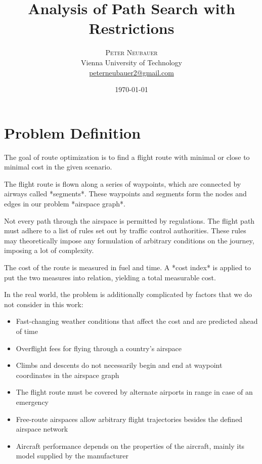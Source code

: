 \documentclass{article}
\title{Analysis of Path Search with Restrictions} %
\author{%
\textsc{Peter Neubauer} \\[1ex] %
\normalsize Vienna University of Technology \\ %
\normalsize \href{mailto:peterneubauer2@gmail.com}{peterneubauer2@gmail.com} %
}
\date{\today} %
\begin{document}
\maketitle


\section{Problem Definition}
The goal of route optimization is to find a flight route with minimal or close to minimal cost in the given scenario.

The flight route is flown along a series of waypoints, which are connected by airways called *segments*. These waypoints and segments form the nodes and edges in our problem *airspace graph*.

Not every path through the airspace is permitted by regulations. The flight path must adhere to a list of rules set out by traffic control authorities. These rules may theoretically impose any formulation of arbitrary conditions on the journey, imposing a lot of complexity.

The cost of the route is measured in fuel and time. A *cost index* is applied to put the two measures into relation, yielding a total measurable cost.

In the real world, the problem is additionally complicated by factors that we do not consider in this work:

\begin{itemize}

\item Fast-changing weather conditions that affect the cost and are predicted ahead of time

\item Overflight fees for flying through a country's airspace

\item Climbs and descents do not necessarily begin and end at waypoint coordinates in the airspace graph

\item The flight route must be covered by alternate airports in range in case of an emergency

\item Free-route airspaces allow arbitrary flight trajectories besides the defined airspace network

\item Aircraft performance depends on the properties of the aircraft, mainly its model supplied by the manufacturer

\end{itemize}
\end{document}

